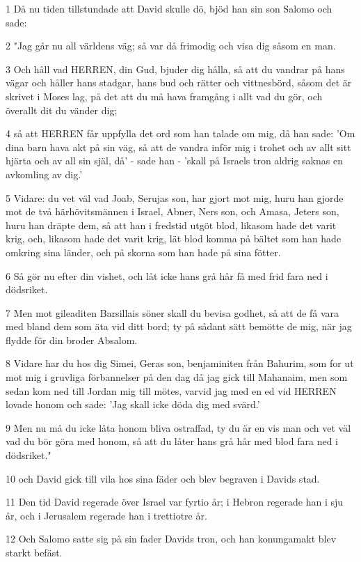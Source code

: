 \par 1 Då nu tiden tillstundade att David skulle dö, bjöd han sin son Salomo och sade:
\par 2 "Jag går nu all världens väg; så var då frimodig och visa dig såsom en man.
\par 3 Och håll vad HERREN, din Gud, bjuder dig hålla, så att du vandrar på hans vägar och håller hans stadgar, hans bud och rätter och vittnesbörd, såsom det är skrivet i Moses lag, på det att du må hava framgång i allt vad du gör, och överallt dit du vänder dig;
\par 4 så att HERREN får uppfylla det ord som han talade om mig, då han sade: 'Om dina barn hava akt på sin väg, så att de vandra inför mig i trohet och av allt sitt hjärta och av all sin själ, då' - sade han - 'skall på Israels tron aldrig saknas en avkomling av dig.'
\par 5 Vidare: du vet väl vad Joab, Serujas son, har gjort mot mig, huru han gjorde mot de två härhövitsmännen i Israel, Abner, Ners son, och Amasa, Jeters son, huru han dräpte dem, så att han i fredstid utgöt blod, likasom hade det varit krig, och, likasom hade det varit krig, lät blod komma på bältet som han hade omkring sina länder, och på skorna som han hade på sina fötter.
\par 6 Så gör nu efter din vishet, och låt icke hans grå hår få med frid fara ned i dödsriket.
\par 7 Men mot gileaditen Barsillais söner skall du bevisa godhet, så att de få vara med bland dem som äta vid ditt bord; ty på sådant sätt bemötte de mig, när jag flydde för din broder Absalom.
\par 8 Vidare har du hos dig Simei, Geras son, benjaminiten från Bahurim, som for ut mot mig i gruvliga förbannelser på den dag då jag gick till Mahanaim, men som sedan kom ned till Jordan mig till mötes, varvid jag med en ed vid HERREN lovade honom och sade: 'Jag skall icke döda dig med svärd.'
\par 9 Men nu må du icke låta honom bliva ostraffad, ty du är en vis man och vet väl vad du bör göra med honom, så att du låter hans grå hår med blod fara ned i dödsriket."
\par 10 och David gick till vila hos sina fäder och blev begraven i Davids stad.
\par 11 Den tid David regerade över Israel var fyrtio år; i Hebron regerade han i sju år, och i Jerusalem regerade han i trettiotre år.
\par 12 Och Salomo satte sig på sin fader Davids tron, och han konungamakt blev starkt befäst.
